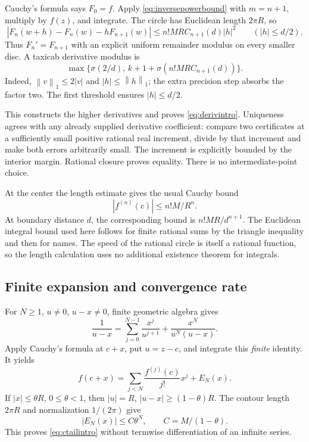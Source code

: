 \documentclass[11pt]{article}
\theoremstyle{definition}
\newcommand{\norm}[1]{\left\lVert#1\right\rVert_1}
\begin{document}
Cauchy's formula says \(F_0=f\). Apply \eqref{eq:inversepowerbound} with
\(m=n+1\), multiply by \(f(z)\), and integrate. The circle has Euclidean
length \(2\pi R\), so
\begin{equation}\label{eq:Fderivative}
 |F_n(w+h)-F_n(w)-hF_{n+1}(w)|
 \le n!MR C_{n+1}(d)|h|^2\qquad(|h|\le d/2).
\end{equation}
Thus \(F_n'=F_{n+1}\) with an explicit uniform remainder modulus on every
smaller disc. A taxicab derivative modulus is
\[
 \max\{\sigma(2/d),\, k+1+\sigma(n!MR C_{n+1}(d))\}.
\]
Indeed, \(\norm v\le2|v|\) and \(|h|\le\norm h\); the extra precision
step absorbs the factor two. The first threshold ensures \(|h|\le d/2\).

This constructs the higher derivatives and proves \eqref{eq:derivintro}.
Uniqueness agrees with any already supplied derivative coefficient:
compare two certificates at a sufficiently small positive rational real
increment, divide by that increment and make both errors arbitrarily
small. The increment is explicitly bounded by the interior margin.
Rational closure proves equality. There is no intermediate-point choice.

At the center the length estimate gives the usual Cauchy bound
\begin{equation}\label{eq:cauchybound}
 |f^{(n)}(c)|\le n!M/R^n.
\end{equation}
At boundary distance \(d\), the corresponding bound is \(n!MR/d^{n+1}\).
The Euclidean integral bound used here follows for finite rational sums
by the triangle inequality and then for names. The speed of the rational
circle is itself a rational function, so the length calculation uses no
additional existence theorem for integrals.

\subsection{Finite expansion and convergence rate}

For \(N\ge1\), \(u\ne0\), \(u-x\ne0\), finite geometric algebra gives
\begin{equation}\label{eq:geometrickernel}
 \frac1{u-x}=\sum_{j=0}^{N-1}\frac{x^j}{u^{j+1}}
                        +\frac{x^N}{u^N(u-x)}.
\end{equation}
Apply Cauchy's formula at \(c+x\), put \(u=z-c\), and integrate this
\emph{finite} identity. It yields
\[
 f(c+x)=\sum_{j<N}\frac{f^{(j)}(c)}{j!}x^j+E_N(x).
\]
If \(|x|\le\theta R\), \(0\le\theta<1\), then
\(|u|=R\), \(|u-x|\ge(1-\theta)R\).
The contour length \(2\pi R\) and normalization \(1/(2\pi)\) give
\begin{equation}\label{eq:analytictail}
 |E_N(x)|\le C\theta^N,\qquad C=M/(1-\theta).
\end{equation}
This proves \eqref{eq:ctailintro} without termwise differentiation of an
infinite series.
\end{document}
